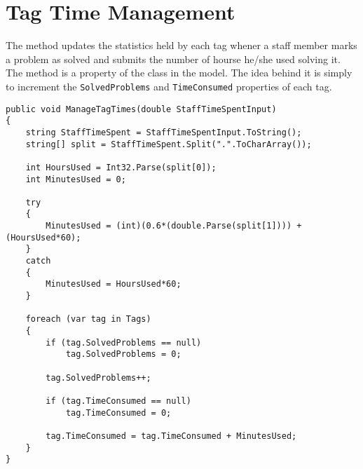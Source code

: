 \section{Tag Time Management}
\label{sec:managetagtimes}

The  method updates the statistics held by each tag whener a staff member marks a problem as solved and submits the number of hourse he/she used solving it. The  method is a property of the  class in the model.
The idea behind it is simply to increment the \verb+SolvedProblems+ and \verb+TimeConsumed+ properties of each tag. 

\begin{lstlisting}[style=sourceCode, caption=\myCaption{The ManageTagTimes method}, label=lst:managetagtimes]
public void ManageTagTimes(double StaffTimeSpentInput)
{
    string StaffTimeSpent = StaffTimeSpentInput.ToString();
    string[] split = StaffTimeSpent.Split(".".ToCharArray());
    
    int HoursUsed = Int32.Parse(split[0]);
    int MinutesUsed = 0;

    try
    {
        MinutesUsed = (int)(0.6*(double.Parse(split[1]))) + (HoursUsed*60);
    }
    catch
    {
        MinutesUsed = HoursUsed*60;
    }

    foreach (var tag in Tags)
    {
        if (tag.SolvedProblems == null)
            tag.SolvedProblems = 0;
        
        tag.SolvedProblems++;

        if (tag.TimeConsumed == null)
            tag.TimeConsumed = 0;

        tag.TimeConsumed = tag.TimeConsumed + MinutesUsed;
    }
}
\end{lstlisting}